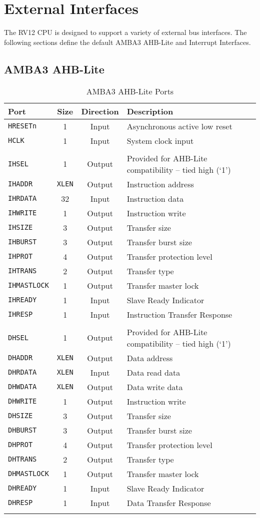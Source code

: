 \chapter{External Interfaces}\label{external-interfaces}

The RV12 CPU is designed to support a variety of external bus interfaces.
The following sections define the default AMBA3 AHB-Lite and Interrupt
Interfaces.

\section{AMBA3 AHB-Lite}\label{amba3-ahb-lite}

\begin{longtable}[]{@{}lccl@{}}
	\toprule
	Port                & Size          & Direction & Description\tabularnewline
	\midrule
	\endhead
	\texttt{HRESETn}    & 1             & Input     & Asynchronous active low reset\tabularnewline
	\texttt{HCLK}       & 1             & Input     & System clock input\tabularnewline
	                    &               &           & \tabularnewline
	\texttt{IHSEL}      & 1             & Output    & Provided for AHB-Lite compatibility -- tied high (`1')\tabularnewline
	\texttt{IHADDR}     & \texttt{XLEN} & Output    & Instruction address\tabularnewline
	\texttt{IHRDATA}    & 32            & Input     & Instruction data\tabularnewline
	\texttt{IHWRITE}    & 1             & Output    & Instruction write\tabularnewline
	\texttt{IHSIZE}     & 3             & Output    & Transfer size\tabularnewline
	\texttt{IHBURST}    & 3             & Output    & Transfer burst size\tabularnewline
	\texttt{IHPROT}     & 4             & Output    & Transfer protection level\tabularnewline
	\texttt{IHTRANS}    & 2             & Output    & Transfer type\tabularnewline
	\texttt{IHMASTLOCK} & 1             & Output    & Transfer master lock\tabularnewline
	\texttt{IHREADY}    & 1             & Input     & Slave Ready Indicator\tabularnewline
	\texttt{IHRESP}     & 1             & Input     & Instruction Transfer Response\tabularnewline
	                    &               &           & \tabularnewline
	\texttt{DHSEL}      & 1             & Output    & Provided for AHB-Lite compatibility -- tied high (`1')\tabularnewline
	\texttt{DHADDR}     & \texttt{XLEN} & Output    & Data address\tabularnewline
	\texttt{DHRDATA}    & \texttt{XLEN} & Input     & Data read data\tabularnewline
	\texttt{DHWDATA}    & \texttt{XLEN} & Output    & Data write data\tabularnewline
	\texttt{DHWRITE}    & 1             & Output    & Instruction write\tabularnewline
	\texttt{DHSIZE}     & 3             & Output    & Transfer size\tabularnewline
	\texttt{DHBURST}    & 3             & Output    & Transfer burst size\tabularnewline
	\texttt{DHPROT}     & 4             & Output    & Transfer protection level\tabularnewline
	\texttt{DHTRANS}    & 2             & Output    & Transfer type\tabularnewline
	\texttt{DHMASTLOCK} & 1             & Output    & Transfer master lock\tabularnewline
	\texttt{DHREADY}    & 1             & Input     & Slave Ready Indicator\tabularnewline
	\texttt{DHRESP}     & 1             & Input     & Data Transfer Response\tabularnewline
	\bottomrule
	\caption{AMBA3 AHB-Lite Ports}
	\label{tab:ahb-ports}
\end{longtable}

